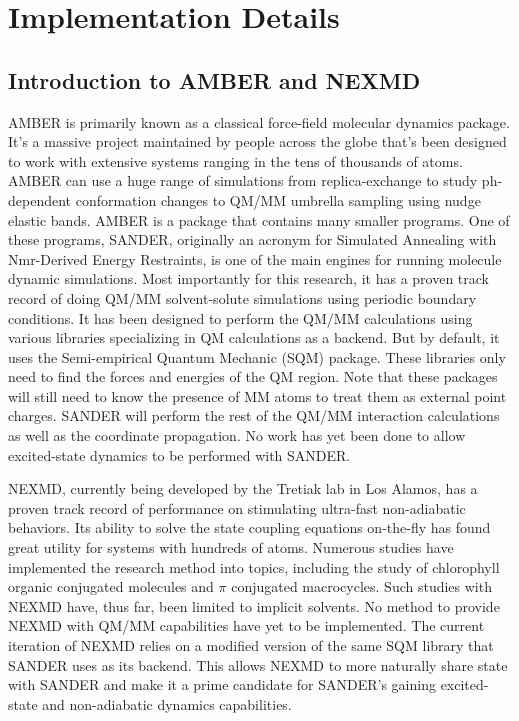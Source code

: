 \chapter{Implementation Details} \label{implementationDetails}

\section{Introduction to AMBER and NEXMD}

AMBER is primarily known as a classical force-field molecular dynamics package.
It's a massive project maintained by people across the globe that's been designed to work with extensive systems ranging in the tens of thousands of atoms. \cite{case2020a}
AMBER can use a huge range of simulations from replica-exchange to study ph-dependent conformation changes to QM/MM umbrella sampling using nudge elastic bands. \cite{cruzeiro2020exploring, ghoreishi2019fast,sarkar2019ph}
AMBER is a package that contains many smaller programs. One of these programs, SANDER, originally an acronym for Simulated Annealing with Nmr-Derived Energy Restraints, is one of the main engines for running molecule dynamic simulations. 
Most importantly for this research, it has a proven track record of doing QM/MM solvent-solute simulations using periodic boundary conditions.
It has been designed to perform the QM/MM calculations using various libraries specializing in QM calculations as a backend. But by default, it uses the Semi-empirical Quantum Mechanic (SQM) package. These libraries only need to find the forces and energies of the QM region. Note that these packages will still need to know the presence of MM atoms to treat them as external point charges. SANDER will perform the rest of the QM/MM interaction calculations as well as the coordinate propagation. No work has yet been done to allow excited-state dynamics to be performed with SANDER.

NEXMD, currently being developed by the Tretiak lab in Los Alamos, has a proven track record of performance on stimulating ultra-fast non-adiabatic behaviors.
Its ability to solve the state coupling equations on-the-fly has found great utility for systems with hundreds of atoms.
Numerous studies have implemented the research method into topics, including the study of chlorophyll organic conjugated molecules and \(\pi\) conjugated macrocycles.  \cite{zheng2017photoinduced,nelson2014nonadiabatic,alfonso2016interference,wu2006exciton,Ondarse-Alvarez2016}
Such studies with NEXMD have, thus far, been limited to implicit solvents.
No method to provide NEXMD with QM/MM capabilities have yet to be implemented.
The current iteration of NEXMD relies on a modified version of the same SQM library that SANDER uses as its backend. This allows NEXMD to more naturally share state with SANDER and make it a prime candidate for SANDER's gaining excited-state and non-adiabatic dynamics capabilities.

